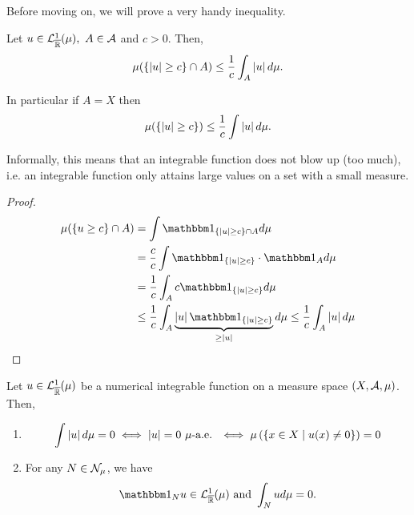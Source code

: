Before moving on, we will prove a very handy inequality.

\begin{thm}
	\label{thm:markov-inequality}
	Let $u \in \mathcal{L}_{\overline{\mathbb{R}}}^1(\mu),\ A \in \mathcal{A}$ and $c > 0$. Then,
	\begin{align}
		\mu(\{\left\vert{u}\right\vert \geq c\} \cap A) \leq \frac{1}{c} \int_A \left\vert{u}\right\vert d\mu.
	\end{align}
	
	In particular if $A = X$ then
	\begin{align*}
		\mu(\{\left\vert{u}\right\vert \geq c\}) \leq \frac{1}{c} \int \left\vert{u}\right\vert d\mu.
	\end{align*}
\end{thm}

Informally, this means that an integrable function does not blow up (too much), i.e. an integrable function only attains large values on a set with a small measure.

\begin{proof}
	\begin{align*}
		\mu(\{u \geq c\} \cap A)
		&= \int \ind_{\{\abs{u} \geq c\} \cap A} d\mu \\
		&= \frac{c}{c} \int \ind_{\{\abs{u} \geq c\}} \cdot \ind_A d\mu\\
		&= \frac{1}{c} \int_A c \ind_{\{\abs{u} \geq c\}} d\mu\\
		&\leq \frac{1}{c} \int_A \underbrace{\abs{u}\ind_{\{\abs{u} \geq c\}}}_{\geq \abs{u}} d\mu
		\leq \frac{1}{c} \int_A \abs{u} d\mu
	\end{align*}
\end{proof}

\begin{thm}
	\label{thm:null-integral-ae}
	Let $u \in \mathcal{L}_{\overline{\mathbb{R}}}^1(\mu)$ be a numerical integrable function on a measure space $(X, \mathcal{A}, \mu)$. Then,
	\begin{enumerate}
		\item
		\begin{align}
			\int \left\vert{u}\right\vert d\mu = 0 \iff \left\vert{u}\right\vert = 0 \ \mu\text{-a.e. } \iff \mu\left(\left\{ x \in X \mid u(x) \neq 0 \right\}\right) = 0
		\end{align}
		\item For any $N \in \mathcal{N}_\mu$, we have
		\begin{align}
			\ind_N u \in \calL^1_\Rb(\mu) \text{ and }\int_N u d\mu = 0.
		\end{align}
	\end{enumerate}
\end{thm}

